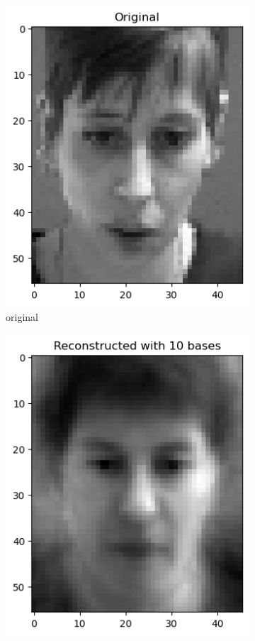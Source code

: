 \begin{figure}[htbp]
\begin{subfigure}[t]{0.2\linewidth}
		\includegraphics[width=\linewidth]{image/q1_recon_test_original.png}
		\caption{original}
		\label{fig:test_re_original}
	\end{subfigure}%
    \hfill
	\begin{subfigure}[t]{0.2\linewidth}
		\centering
		\includegraphics[width=\linewidth]{image/q1_recon_test_10.png}

\end{subfigure}
\end{figure}
